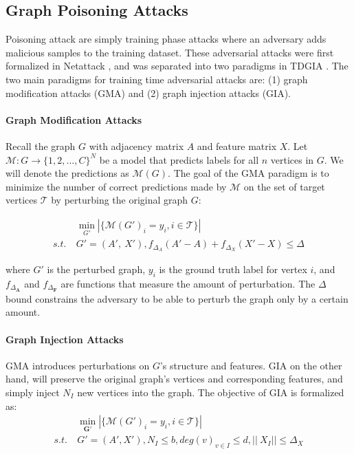 \documentclass{article}
\begin{document}
\subsection{Graph Poisoning Attacks}

Poisoning attack are simply training phase attacks where an adversary adds malicious samples to the training dataset. These adversarial attacks were first formalized in Netattack \cite{netattack}, and was separated into two paradigms in TDGIA \cite{TDGIA}. The two main paradigms for training time adversarial attacks are: (1) graph modification attacks (GMA) and (2) graph injection attacks (GIA). 

\paragraph{Graph Modification Attacks}

Recall the graph $G$ with adjacency matrix $A$ and feature matrix $X$. Let $\mathcal{M}:G\rightarrow \{1,2,...,C\}^N$ be a model that predicts labels for all $n$ vertices in $G$. We will denote the predictions as $\mathcal{M}(G)$. The goal of the GMA paradigm is to minimize the number of correct predictions made by $\mathcal{M}$ on the set of target vertices $\mathcal{T}$ by perturbing the original graph $G$:

\begin{equation}
\label{GMA}
\begin{split}
& \min_{G'}|\{\mathcal{M}(G')_i=y_i, i\in\mathcal{T}\}| \\
s.t.\ & G'=(A', \ X'),f_{\Delta_{A}}(A'-A)+f_{\Delta_{X}}(X'-X)\leq\Delta
\end{split}    
\end{equation}

where $G'$ is the perturbed graph, $y_i$ is the ground truth label for vertex $i$, and $f_{\Delta_{\mathbf{A}}}$ and $f_{\Delta_{\mathbf{F}}}$ are functions that measure the amount of perturbation. The $\Delta$ bound constrains the adversary to be able to perturb the graph only by a certain amount. 

\paragraph{Graph Injection Attacks}
GMA introduces perturbations on $G$'s structure and features. GIA on the other hand, will preserve the original graph's vertices and corresponding features, and simply inject $N_I$ new vertices into the graph. The objective of GIA is formalized as:
\begin{equation}
\label{GIA}
\begin{split}
& \min_{\mathbf{G}'} |\{\mathcal{M}(G')_i=y_i, i\in\mathcal{T}\}| \\
s.t.\ & G'=(A',X'), N_I \leq b, deg(v)_{v\in I}\leq d, ||\ X_I||\leq \Delta_X
\end{split}
\end{equation}
\end{document}
